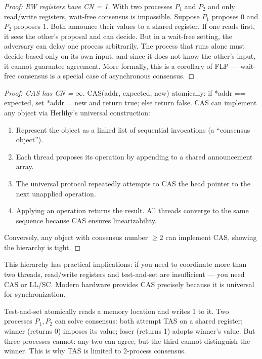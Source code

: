 \begin{proof}[Proof: RW registers have CN = 1]
With two processes $P_1$ and $P_2$ and only read/write registers, wait-free consensus is impossible. Suppose $P_1$ proposes 0 and $P_2$ proposes 1. Both announce their values to a shared register. If one reads first, it sees the other's proposal and can decide. But in a wait-free setting, the adversary can delay one process arbitrarily. The process that runs alone must decide based only on its own input, and since it does not know the other's input, it cannot guarantee agreement. More formally, this is a corollary of FLP — wait-free consensus is a special case of asynchronous consensus.
\end{proof}

\begin{proof}[Proof: CAS has CN = $\infty$]
CAS(addr, expected, new) atomically: if *addr == expected, set *addr = new and return true; else return false. CAS can implement any object via Herlihy's universal construction:
\begin{enumerate}
\item Represent the object as a linked list of sequential invocations (a ``consensus object'').
\item Each thread proposes its operation by appending to a shared announcement array.
\item The universal protocol repeatedly attempts to CAS the head pointer to the next unapplied operation.
\item Applying an operation returns the result. All threads converge to the same sequence because CAS ensures linearizability.
\end{enumerate}
Conversely, any object with consensus number $\ge 2$ can implement CAS, showing the hierarchy is tight.
\end{proof}

This hierarchy has practical implications: if you need to coordinate more than two threads, read/write registers and test-and-set are insufficient — you need CAS or LL/SC. Modern hardware provides CAS precisely because it is universal for synchronization.

\begin{example}[Test-and-Set Has CN = 2]
Test-and-set atomically reads a memory location and writes 1 to it. Two processes $P_1, P_2$ can solve consensus: both attempt TAS on a shared register; winner (returns 0) imposes its value; loser (returns 1) adopts winner's value. But three processes cannot: any two can agree, but the third cannot distinguish the winner. This is why TAS is limited to 2-process consensus.
\end{example}


